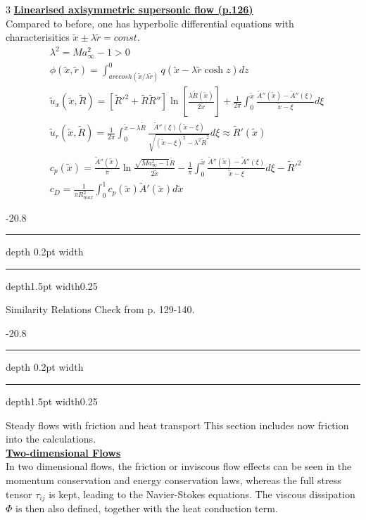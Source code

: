 \documentclass[8pt, landscape, fleqn]{scrartcl}
\makeatletter
\renewcommand{\section}{\@startsection{section}{1}{0mm}%
{-2\baselineskip}{0.8\baselineskip}%
{\hrule depth 0.2pt width\columnwidth\hrule depth1.5pt
width0.25\columnwidth\vspace*{1.2em}\Large\bfseries\rmfamily}}
\makeatother
\begin{document}
\begin{multicols*}{3}
\underline{\textbf{Linearised axisymmetric supersonic flow (p.126)}} \\
Compared to before, one has hyperbolic differential equations with characterisitics $\tilde{x}\pm \lambda \tilde{r} = const.$
\begin{align*}
    &\lambda^2 = Ma_\infty^2-1 > 0 \\
    &\phi(\tilde{x},\tilde{r}) = \int_{arccosh(\tilde{x}/\lambda\tilde{r})}^0 q (\tilde{x}-\lambda\tilde{r}\cosh z)dz \\
    &\tilde{u}_x(\tilde{x},\tilde{R}) = \left[ \tilde{R}'^2 + \tilde{R}\tilde{R}'' \right] \ln\left[ \frac{\lambda \tilde{R}(\tilde{x})}{2\tilde{x}}\right]+\frac{1}{2\pi}\int_0^{\tilde{x}} \frac{\tilde{A}''(\tilde{x})-\tilde{A}''(\xi)}{\tilde{x}-\xi} d\xi \\
    &\tilde{u}_r(\tilde{x},\tilde{R}) = \frac{1}{2\pi}\int_0^{\tilde{x}-\lambda\tilde{R}} \frac{\tilde{A}''(\xi)(\tilde{x}-\xi)}{\sqrt{(\tilde{x}-\xi)^2-\lambda^2\tilde{R}^2}} d\xi \approx \tilde{R}'(\tilde{x}) \\
    &c_p(\tilde{x}) =\frac{\tilde{A}''(\tilde{x})}{\pi}\ln \frac{\sqrt{Ma_\infty^2-1}\tilde{R}}{2\tilde{x}} - \frac{1}{\pi}\int_0^{\tilde{x}} \frac{\tilde{A}''(\tilde{x})-\tilde{A}''(\xi)}{\tilde{x}-\xi} d\xi - \tilde{R}'^2 \\
    &c_D = \frac{1}{\pi R_{max}^2} \int_0^1 c_p(\tilde{x})\tilde{A}'(\tilde{x})d\tilde{x}
\end{align*}

\section{Similarity Relations}
Check from p. 129-140.

\section{Steady flows with friction and heat transport}
This section includes now friction into the calculations.\\

\underline{\textbf{Two-dimensional Flows}} \\
In two dimensional flows, the friction or inviscous flow effects can be seen in the momentum conservation and energy conservation laws, whereas the full stress tensor $\tau_{ij}$ is kept, leading to the Navier-Stokes equations. The viscous dissipation $\Phi$ is then also defined, together with the heat conduction term. \\


\end{multicols*}
\end{document}
